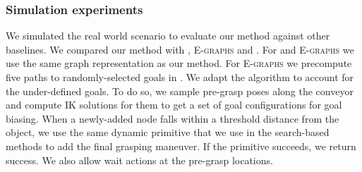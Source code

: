 \documentclass[conference]{IEEEtran}
\begin{document}

\subsubsection{Simulation experiments}






We simulated the real world scenario to evaluate our method against other baselines. We compared our method with \wastar, \textsc{E-graphs} and \rrt. 
For \wastar and \textsc{E-graphs} we use the same graph representation as our method. 
For \textsc{E-graphs} we precompute five paths to randomly-selected  goals in \Gfull. 
We adapt the \rrt algorithm to account for the under-defined goals. To do so, we sample pre-grasp poses along the conveyor 
and compute IK solutions for them to get a set of goal configurations for goal biasing. 
When a newly-added node falls within a threshold distance from the object, we use the same dynamic primitive that we use in the search-based methods to add the final grasping maneuver. If the primitive succeeds, we return success. We also allow wait actions at the pre-grasp locations.
\end{document}
